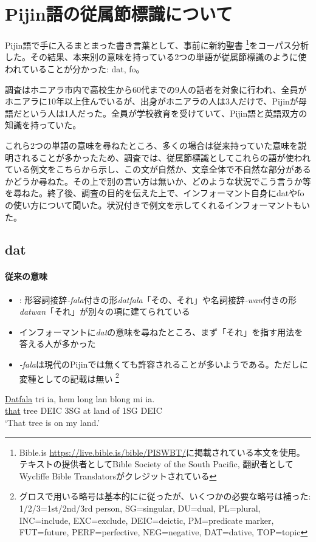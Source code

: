 \documentclass[11pt,a4paper]{jsarticle}
\begin{document}
\section{Pijin語の従属節標識について}
Pijin語で手に入るまとまった書き言葉として、事前に新約聖書 \footnote{Bible.is \url{https://live.bible.is/bible/PISWBT/}に掲載されている本文を使用。テキストの提供者としてBible Society of the South Pacific, 翻訳者としてWycliffe Bible Translatorsがクレジットされている}をコーパス分析した。その結果、本来別の意味を持っている2つの単語が従属節標識のように使われていることが分かった: dat, fo。

調査はホニアラ市内で高校生から60代までの9人の話者を対象に行われ、全員がホニアラに10年以上住んでいるが、出身がホニアラの人は3人だけで、Pijinが母語だという人は1人だった。全員が学校教育を受けていて、Pijin語と英語双方の知識を持っていた。

これら2つの単語の意味を尋ねたところ、多くの場合は従来持っていた意味を説明されることが多かったため、調査では、従属節標識としてこれらの語が使われている例文をこちらから示し、この文が自然か、文章全体で不自然な部分があるかどうか尋ねた。その上で別の言い方は無いか、どのような状況でこう言うか等を尋ねた。終了後、調査の目的を伝えた上で、インフォーマント自身にdatやfoの使い方について聞いた。状況付きで例文を示してくれるインフォーマントもいた。

\subsection{dat}
\paragraph{従来の意味}
\begin{itemize}
  \item \cite{dictionary}: 形容詞接辞\textit{-fala}付きの形\textit{datfala}「その、それ」や名詞接辞\textit{-wan}付きの形\textit{datwan}「それ」が別々の項に建てられている
  \item インフォーマントに\textit{dat}の意味を尋ねたところ、まず「それ」を指す用法を答える人が多かった
  \item \textit{-fala}は現代のPijinでは無くても許容されることが多いようである。ただし\cite{dictionary}に変種としての記載は無い \footnote{グロスで用いる略号は基本的に\cite{prepositions}に従ったが、いくつかの必要な略号は補った: 1/2/3=1st/2nd/3rd person, SG=singular, DU=dual, PL=plural, INC=include, EXC=exclude, DEIC=deictic, PM=predicate marker, FUT=future, PERF=perfective, NEG=negative, DAT=dative, TOP=topic}
\end{itemize}
\begin{exe}
\ex
\gll \underline{Datfala} tri ia, hem long lan blong mi ia.\\
\underline{that} tree DEIC 3SG at land of 1SG DEIC\\
\glt `That tree is on my land.'
\end{exe}
\end{document}
